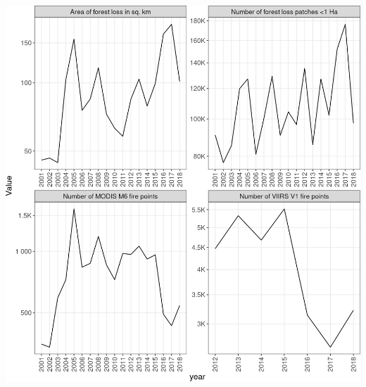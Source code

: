 \documentclass[10pt,landscape,a3paper]{article}
\begin{document}
\begin{center}\includegraphics{img/modelling/aa-eda-ts-4} \end{center}
\end{document}
